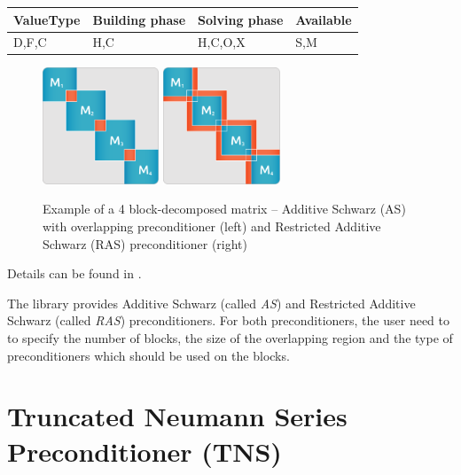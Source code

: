 \begin{table}[H]
\begin{tabular}{l|l|l|l}
\multicolumn{1}{c|}{ValueType} & Building phase & Solving phase & Available \\ \hline
D,F,C                          & H,C            & H,C,O,X       & S,M      
\end{tabular}
\end{table}


\begin{figure}[h]
\centering
\includegraphics[width=0.31\textwidth]{./fig/AS}
\hspace{10mm}
\includegraphics[width=0.31\textwidth]{./fig/RAS}
\caption{Example of a 4 block-decomposed matrix -- Additive Schwarz (AS) with overlapping preconditioner (left) and Restricted Additive Schwarz (RAS) preconditioner (right)}
\label{blockprecond}
\end{figure}

Details can be found in \cite{SAAD,RAS,Quarteroni1999,Smith1996,Toselli2005}.

The library provides Additive Schwarz (called \emph{AS}) and Restricted Additive Schwarz (called \emph{RAS}) preconditioners. For both preconditioners, the user need to to specify the number of blocks, the size of the overlapping region and the type of preconditioners which should be used on the blocks.



\section{Truncated Neumann Series Preconditioner (TNS)}

